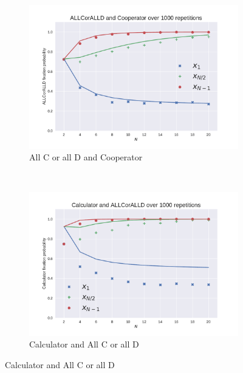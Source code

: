\documentclass[10pt,journal]{IEEEtran}
\begin{document}
\begin{figure}[!hbtp]
    \centering

    \begin{subfigure}[t]{.5\columnwidth}
        \centering
        \includegraphics[width=.95\columnwidth]{img/ALLCorALLD_v_Cooperator.pdf}
        \caption{All C or all D and Cooperator}
    \end{subfigure}%
    ~
    \begin{subfigure}[t]{.5\columnwidth}
        \centering
        \includegraphics[width=.95\columnwidth]{img/Calculator_v_ALLCorALLD.pdf}
        \caption{Calculator and All C or all D}
    \end{subfigure}%
    

\end{figure}
\end{document}
